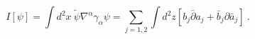 \begin{equation}\label{2.6}
I[\psi]=\int d^2x ~\tilde{\psi}\nabla^\alpha \gamma_\alpha\psi
=\sum_{j=1,2}\int d^2z \left[b_j \bar{\partial} a_j+
\bar{b}_j \partial \bar{a}_j\right]~.
\end{equation}

